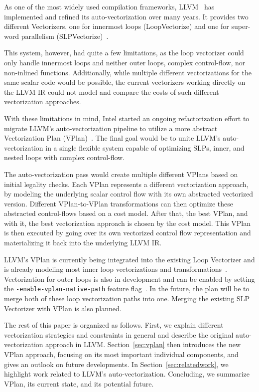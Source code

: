 \documentclass[sigplan,11pt,nonacm]{acmart}
\begin{document}
As one of the most widely used compilation frameworks, LLVM~\cite{10.5555/977395.977673} has 
implemented and refined its auto-vectorization over many years. It provides two different 
Vectorizers, one for innermost loops (LoopVectorize) and one for super-word parallelism 
(SLPVectorize)~\cite{llvmvec}.

This system, however, had quite a few limitations, as the loop vectorizer could only handle
innermost loops and neither outer loops, complex control-flow, nor non-inlined functions. 
Additionally, while multiple different vectorizations for the same scalar code 
would be possible, the current vectorizers working directly on the LLVM IR could not model
and compare the costs of such different vectorization approaches.

With these limitations in mind, Intel started an ongoing refactorization effort to migrate LLVM's
auto-vectorization pipeline to utilize a more abstract Vectorization Plan 
(VPlan)~\cite{llvmextloopvec,llvmvplan}. The final goal would be to unite LLVM's auto-vectorization
in a single flexible system capable of optimizing SLPs, inner, and nested loops with complex 
control-flow.

The auto-vectorization pass would create multiple different VPlans based on initial legality 
checks. Each VPlan represents a different vectorization approach, by modeling the
underlying scalar control flow with its own abstracted vectorized version. Different VPlan-to-VPlan
transformations can then optimize these abstracted control-flows based on a cost model.
After that, the best VPlan, and with it, the best vectorization approach is chosen by the cost model.
This VPlan is then executed by going over its own vectorized control flow representation and
materializing it back into the underlying LLVM IR.

LLVM's VPlan is currently being integrated into the existing Loop Vectorizer and is
already modeling most inner loop vectorizations and transformations~\cite{llvmvplanupdate}. 
Vectorization for outer loops is also in development and can be enabled by setting 
the \texttt{-enable-\allowbreak vplan-\allowbreak native-\allowbreak path} feature 
flag~\cite{llvmouterloop,llvmouterloopstatus}. 
In the future, the plan will be to merge both of these loop vectorization paths into one. 
Merging the existing SLP Vectorizer with VPlan is also planned.

The rest of this paper is organized as follows. First, we explain different vectorization
strategies and constraints in general and describe the original auto-vectorization
approach in LLVM. Section~\ref{sec:vplan} then introduces the new VPlan approach, focusing on
its most important individual components, and gives an outlook on future developments. In 
Section~\ref{sec:relatedwork}, we highlight work related to LLVM's auto-vectorization. Concluding,
we summarize VPlan, its current state, and its potential future.
\end{document}

